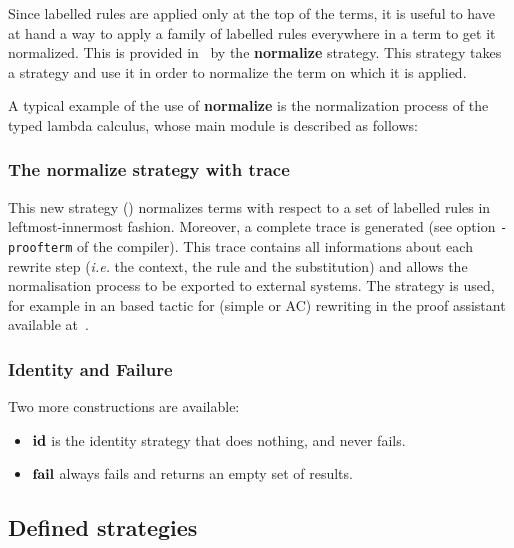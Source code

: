 Since labelled rules are applied only at the top of the
terms, it is useful to have at hand a way to apply a family of
labelled rules everywhere in a term to get it normalized. This is
provided in \elan\ by the {\bf normalize} strategy. This strategy
takes a strategy and use it in order to normalize the term on which it
is applied.


\EX

A typical example of the use of {\bf normalize} is the normalization
process of the typed lambda calculus, whose main module is described
as follows:\\

\FEX

\subsubsection{The normalize strategy with trace}
This new strategy () normalizes terms with respect to a set of labelled rules in leftmost-innermost fashion.
Moreover, a complete trace is generated (see option \verb|-proofterm| of the compiler).
This trace contains all informations about each rewrite step ({\it i.e.}
the context, the rule and the substitution) and allows the
normalisation process to be exported to external systems. The
strategy  is used, for example in an {\elan} based tactic for
(simple or AC) rewriting in the {\coq} proof assistant available
at~\cite{ACCoqELAN}.

\subsubsection{Identity and Failure}

Two more  constructions are available:

\begin{itemize}
\item $\textbf{id}$ is the identity strategy that does nothing, and never fails.

\item $\textbf{fail}$ always fails and returns an empty set of results.
\end{itemize}


\subsection{Defined strategies}
\label{DefinedStrategies}

